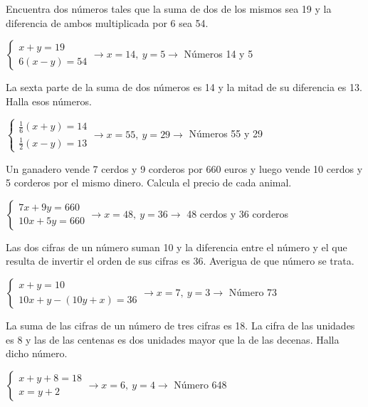 \documentclass[spanish, 12pt]{exam}
\begin{document}
\begin{questions}

\question Encuentra dos números tales que la suma de dos de los mismos sea 19 y la diferencia de ambos multiplicada por 6 sea 54.
\begin{solution} $\left\{\begin{matrix}x+y=19 \\ 6(x-y)=54\end{matrix}\right. \to  x = 14, \  y = 5 \to$ Números 14 y 5 \end{solution}

\question La sexta parte de la suma de dos números es 14 y la mitad de su diferencia es 13. Halla esos números.
\begin{solution} $\left\{\begin{matrix}\frac{1}{6}(x+y)=14 \\ \frac{1}{2}(x-y)=13\end{matrix}\right. \to  x = 55, \  y = 29 \to$ Números 55 y 29 \end{solution}

\question Un ganadero vende 7 cerdos y 9 corderos por 660 euros y luego vende 10 cerdos y 5 corderos por el mismo dinero. Calcula el precio de cada animal.
\begin{solution} $\left\{\begin{matrix}7x+9y=660 \\ 10x+5y=660\end{matrix}\right. \to  x = 48, \  y = 36 \to$ 48 cerdos y 36 corderos \end{solution}

\question Las dos cifras de un número suman 10 y la diferencia entre el número y el que resulta de invertir el orden de sus cifras es 36. Averigua de que número se trata.

\begin{solution}  $\left\{\begin{matrix}x+y=10 \\ 10x+y-(10y+x)=36\end{matrix}\right. \to  x = 7, \  y = 3 \to$ Número 73\end{solution}

\question La suma de las cifras de un número de tres cifras es 18. La cifra de las unidades es 8 y las de las centenas es dos unidades mayor que la de las decenas. Halla dicho número. 
\begin{solution} $\left\{\begin{matrix}x+y+8=18 \\ x=y+2\end{matrix}\right. \to  x = 6, \  y = 4 \to$ Número 648 \end{solution}


\end{questions}
\end{document}
